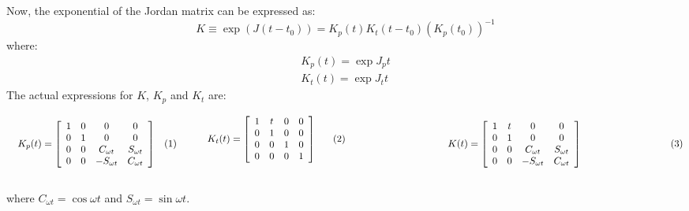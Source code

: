 		\indent Now, the exponential of the Jordan matrix can be expressed as:
		\begin{equation}
		K \equiv \exp \left(J(t - t_0)\right) = K_p(t) K_t(t - t_0) \left(K_p(t_0)\right)^{-1}
		\label{eqCh2:K_decomp}
		\end{equation}
		\noindent where:
		\begin{subequations}
		\begin{alignat}{4}
		K_p(t) = \exp J_p t\\
		K_t(t) = \exp J_t t
		\end{alignat}
		\end{subequations}
		\indent The actual expressions for $K$, $K_p$ and $K_t$ are:\\
		\begin{subequations}
		\begin{minipage}{.5\linewidth}
		\begin{equation}
		  K_p(t) = \left[ \begin{array}{cccc}
			1 	& 0	& 0		& 0			\\
			0 	& 1	& 0  				& 0 		\\
			0 	& 0	& C_{\omega t}		& S_{\omega t}	\\
			0 	& 0	& - S_{\omega t}	& C_{\omega t}
		\end{array}\right]
		\label{eqCh2:Kp_exp}
		\end{equation}
		\end{minipage}
		\begin{minipage}{.5\linewidth}
		\begin{equation}
		 K_t(t) = \left[ \begin{array}{cccc}
			1 	& t	& 0	& 0	\\
			0 	& 1	& 0 & 0 	\\
			0 	& 0	& 1	& 0	\\
			0 	& 0	& 0	& 1
			\end{array}\right]
			\label{eqCh2:Kt_exp}
		\end{equation}
		\end{minipage}
		\begin{minipage}{\linewidth}
		\begin{center}
		\begin{equation}
		  K(t) = \left[ \begin{array}{cccc}
			1 	& t	& 0		& 0			\\
			0 	& 1	& 0  				& 0 		\\
			0 	& 0	& C_{\omega t}		& S_{\omega t}	\\
			0 	& 0	& - S_{\omega t}	& C_{\omega t}
		\end{array}\right]
		\label{eqCh2:K_exp}
		\end{equation}
		\end{center}
		\end{minipage}
		\end{subequations}\\
		\noindent where $C_{\omega t} = \cos\omega t$ and $S_{\omega t} = \sin\omega t$.
%
